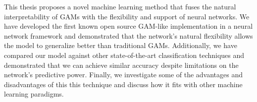 This thesis proposes a novel machine learning method that fuses the natural interpretability of GAMs with the flexibility and support of neural networks. We have developed the first known open source GAM-like implementation in a neural network framework and demonstrated that the network’s natural flexibility allows the model to generalize better than traditional GAMs. Additionally, we have compared our model against other state-of-the-art classification techniques and demonstrated that we can achieve similar accuracy despite limitations on the network’s predictive power. Finally, we investigate some of the advantages and disadvantages of this this technique and discuss how it fits with other machine learning paradigms. 